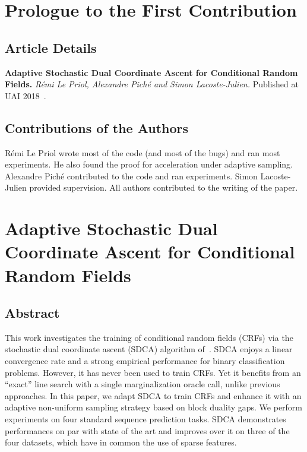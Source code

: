 \setcounter{theorem}{0}

\def\balpha{\boldsymbol{\alpha}}
\def\bmu{\boldsymbol{\mu}}
\def\bw{\boldsymbol{w}}
\newcommand{\bu}{\bm u}
\newcommand{\bv}{\bm v}
\newcommand{\strgconvex}{\mu}
\newcommand{\QM}{QM} %

\chapter{Prologue to the First Contribution}

\section{Article Details}

\textbf{Adaptive Stochastic Dual Coordinate Ascent for Conditional Random Fields.} 
\emph{R\'emi Le Priol, Alexandre Pich\'e and Simon Lacoste-Julien.} 
Published at UAI 2018~\citep{lepriol2018adaptive}.

\section{Contributions of the Authors}
Rémi Le Priol wrote most of the code (and most of the bugs) and ran most experiments. 
He also found the proof for acceleration under adaptive sampling.
Alexandre Piché contributed to the code and ran experiments.
Simon Lacoste-Julien provided supervision.
All authors contributed to the writing of the paper.

\chapter{Adaptive Stochastic Dual Coordinate Ascent for Conditional Random Fields}

\section*{Abstract}
This work investigates the training of conditional random fields (CRFs) via the stochastic dual coordinate ascent (SDCA) algorithm of~\citet{shalev2016accelerated}.
SDCA enjoys a linear convergence rate and a strong empirical performance for binary classification problems.
However, it has never been used to train CRFs.
Yet it benefits from an ``exact'' line search with a single marginalization oracle call, unlike previous approaches.
In this paper, we adapt SDCA to train CRFs and enhance it with an adaptive non-uniform sampling strategy based on block duality gaps.
We perform experiments on four standard sequence prediction tasks.
SDCA demonstrates performances on par with state of the art and improves over it on three of the four datasets, which have in common the use of sparse features.

